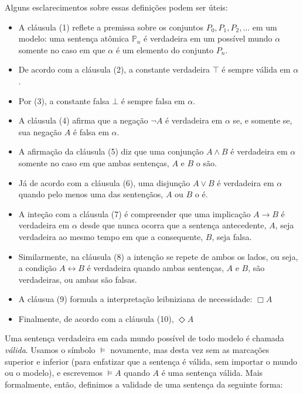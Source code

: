 Alguns esclarecimentos sobre essas definições podem ser úteis:
\begin{itemize}
    \item A cláusula (1) reflete a premissa sobre os conjuntos $P_0, P_1, P_2,
        \ldots$ em um modelo: uma sentença at\^omica $\mathbb{P}_n$ é verdadeira
        em um possível mundo $\alpha$ somente no caso em que $\alpha$ é um
        elemento do conjunto $P_n$.
    \item De acordo com a cláusula (2), a constante verdadeira $\top$ é sempre
        válida em $\alpha$.
    \item Por (3), a constante falsa $\bot$ é sempre falsa em $\alpha$.
    \item A cláusula (4) afirma que a negação $\neg A$ é verdadeira em $\alpha$
        se, e somente se, sua negação $A$ é falsa em $\alpha$.
    \item A afirmação da cláusula (5) diz que uma conjunção $A \wedge B$ é
        verdadeira em $\alpha$ somente no caso em que ambas sentenças, $A$ e
        $B$ o são.
    \item Já de acordo com a cláusula (6), uma disjunção $A \vee B$ é verdadeira
        em $\alpha$ quando pelo menos uma das sentençãos, $A$ ou $B$ o é.
    \item A inteção com a cláusula (7) é compreender que uma implicação $A \rightarrow
        B$ é verdadeira em $\alpha$ desde que nunca ocorra que a sentença antecedente,
        $A$, seja verdadeira ao mesmo tempo em que a consequente, $B$, seja
        falsa.
    \item Similarmente, na cláusula (8) a intenção se repete de ambos os lados,
        ou seja, a condição $A \leftrightarrow B$ é verdadeira quando ambas
        sentenças, $A$ e $B$, são verdadeiras, ou ambas são falsas.
    \item A cláusua (9) formula a interpretação leibniziana de necessidade:
        $\Box A$
    \item Finalmente, de acordo com a cláusula (10), $\Diamond A$
\end{itemize}

Uma sentença verdadeira em cada mundo possível de todo modelo é chamada
\textit{válida}. Usamos o símbolo $\models$ novamente, mas desta vez sem as
marcações superior e inferior (para enfatizar que a sentença é válida, sem
importar o mundo ou o modelo), e escrevemos $\models A$ quando $A$ é uma
sentença válida.
Mais formalmente, então, definimos a validade de uma sentença da seguinte forma:

